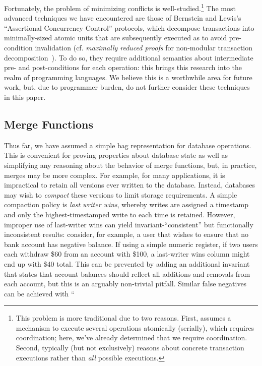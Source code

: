 Fortunately, the problem of minimizing conflicts is
well-studied.\footnote{This problem is more traditional due to two
  reasons. First, assumes a mechanism to execute several operations
  atomically (serially), which requires coordination; here, we've
  already determined that we require coordination. Second, typically
  (but not exclusively) reasons about concrete transaction executions
  rather than \textit{all} possible executions.} The most advanced
techniques we have encountered are those of Bernstein and Lewis's
``Assertional Concurrency Control'' protocols, which decompose
transactions into minimally-sized atomic units that are subsequently
executed as to avoid pre-condition invalidation (cf. \textit{maximally
  reduced proofs} for non-modular transaction
decomposition~\cite{decomp-semantics}). To do so, they require
additional semantics about intermediate pre- and post-conditions for
each operation: this brings this research into the realm of
programming languages. We believe this is a worthwhile area for future
work, but, due to programmer burden, do not further consider these
techniques in this paper.

\subsection{Merge Functions}
\label{sec:merge}

Thus far, we have assumed a simple bag representation for database
operations. This is convenient for proving properties about database
state as well as simplifying any reasoning about the behavior of merge
functions, but, in practice, merges may be more complex. For example,
for many applications, it is impractical to retain all versions ever
written to the database. Instead, databases may wish to
\textit{compact} these versions to limit storage requirements. A
simple compaction policy is \textit{last writer wins}, whereby writes
are assigned a timestamp and only the highest-timestamped write to
each time is retained. However, improper use of last-writer wins can
yield invariant-``consistent'' but functionally inconsistent results:
consider, for example, a user that wishes to ensure that no bank
account has negative balance. If using a simple numeric register, if
two users each withdraw \$60 from an account with \$100, a last-writer
wins column might end up with \$40 total. This can be prevented by
adding an additional invariant that states that account balances
should reflect all additions and removals from each account, but this
is an arguably non-trivial pitfall. Similar false negatives can be
achieved with ``

